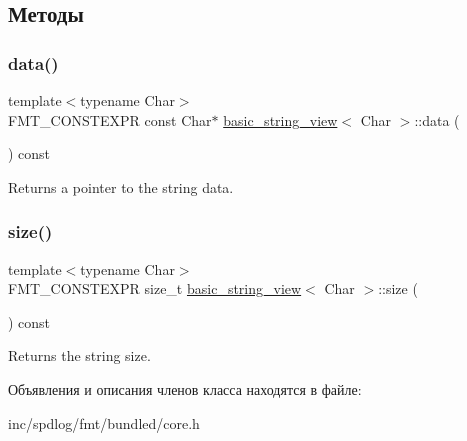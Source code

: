 \subsection{Методы}
\mbox{\label{classbasic__string__view_a48c221f626c53e68f6d63105329f6b08}} 
\subsubsection{\texorpdfstring{data()}{data()}}
{\footnotesize\ttfamily template$<$typename Char$>$ \\
F\+M\+T\+\_\+\+C\+O\+N\+S\+T\+E\+X\+PR const Char$\ast$ \hyperlink{classbasic__string__view}{basic\+\_\+string\+\_\+view}$<$ Char $>$\+::data (\begin{DoxyParamCaption}{ }\end{DoxyParamCaption}) const\hspace{0.3cm}{\ttfamily [inline]}}

Returns a pointer to the string data. \mbox{\label{classbasic__string__view_a7fd9f4dcac1782259b0cd217af69d737}} 
\subsubsection{\texorpdfstring{size()}{size()}}
{\footnotesize\ttfamily template$<$typename Char$>$ \\
F\+M\+T\+\_\+\+C\+O\+N\+S\+T\+E\+X\+PR size\+\_\+t \hyperlink{classbasic__string__view}{basic\+\_\+string\+\_\+view}$<$ Char $>$\+::size (\begin{DoxyParamCaption}{ }\end{DoxyParamCaption}) const\hspace{0.3cm}{\ttfamily [inline]}}

Returns the string size. 

Объявления и описания членов класса находятся в файле\+:\begin{DoxyCompactItemize}
\item 
inc/spdlog/fmt/bundled/core.\+h\end{DoxyCompactItemize}
